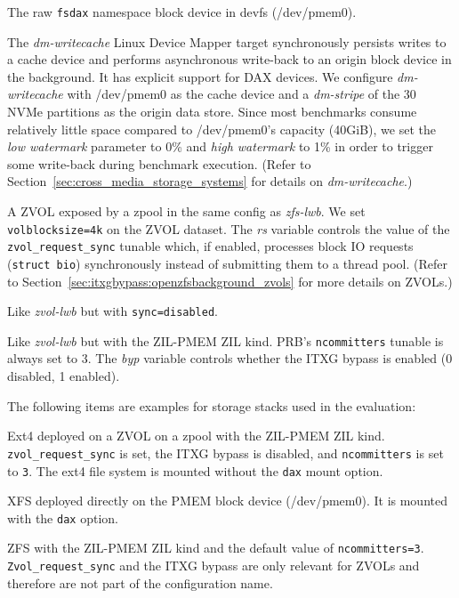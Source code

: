 \documentclass[12pt,a4paper,twoside]{book}
\begin{document}
\begin{description}[noitemsep,leftmargin=1.5cm,labelindent=1cm]
    \item[devpmem] The raw \lstinline{fsdax} namespace block device in devfs (/dev/pmem0).
    \item[dm-writecache]
        The \textit{dm-writecache} Linux Device Mapper target synchro\-nously persists writes to a cache device and performs asynchronous write-back to an origin block device in the background.
        It has explicit support for DAX devices.
        We configure \textit{dm-writecache} with \mbox{/dev/pmem0} as the cache device and a \textit{dm-stripe} of the 30 NVMe partitions as the origin data store.
        Since most benchmarks consume relatively little space compared to /dev/pmem0's capacity (40GiB), we set the \textit{low watermark} parameter to 0\% and \textit{high watermark} to 1\% in order to trigger some write-back during benchmark execution.
        (Refer to Section~\ref{sec:cross_media_storage_systems} for details on \textit{dm-writecache}.)
    \item[zvol-lwb,rs=\{0,1\}]
        A ZVOL exposed by a zpool in the same config as \textit{zfs-lwb}.
        We set \lstinline{volblocksize=4k} on the ZVOL dataset.
        The \textit{rs} variable controls the value of the \lstinline{zvol_request_sync} tunable which, if enabled, processes block IO requests (\lstinline[style=figurepseudocode]{struct bio}) synchronously instead of submitting them to a thread pool.
        (Refer to Section~\ref{sec:itxgbypass:openzfsbackground_zvols} for more details on ZVOLs.)
    \item[zvol-async] Like \textit{zvol-lwb} but with \lstinline{sync=disabled}.
    \item[zvol-pmem,rs=\{0,1\},byp=\{0,1\}] Like \textit{zvol-lwb} but with the ZIL-PMEM ZIL kind.
        PRB's \lstinline{ncommitters} tunable is always set to $3$.
        The \textit{byp} variable controls whether the ITXG bypass is enabled (0 disabled, 1 enabled).
\end{description}
The following items are examples for storage stacks used in the evaluation:
\begin{description}[noitemsep,leftmargin=1.5cm,labelindent=1cm]
    \item[ext4 on zvol-pmem,rs=1,byp=0] Ext4 deployed on a ZVOL on a zpool with the ZIL-PMEM ZIL kind.
        \lstinline{zvol_request_sync} is set, the ITXG bypass is disabled, and \lstinline{ncommitters} is set to \lstinline{3}.
        The ext4 file system is mounted without the \lstinline{dax} mount option.
    \item[xfs-dax on devpmem] XFS deployed directly on the PMEM block device (/dev/pmem0).
    It is mounted with the \lstinline{dax} option.
    \item[zfs-pmem] ZFS with the ZIL-PMEM ZIL kind and the default value of \lstinline{ncommitters=3}.
        \lstinline{Zvol_request_sync} and the ITXG bypass are only relevant for ZVOLs and therefore are not part of the configuration name.
\end{description}
\end{document}
